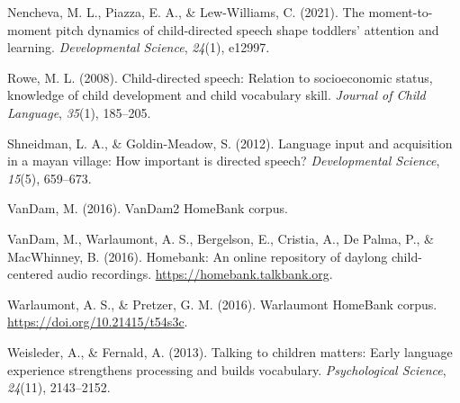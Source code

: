 \documentclass[10pt, letterpaper]{article}
\newenvironment{CSLReferences}%
  {}%
  {\par}
\begin{document}
\begin{CSLReferences}{1}{0}
\leavevmode\hypertarget{ref-nencheva2021moment}{}%
Nencheva, M. L., Piazza, E. A., \& Lew-Williams, C. (2021). The
moment-to-moment pitch dynamics of child-directed speech shape toddlers'
attention and learning. \emph{Developmental Science}, \emph{24}(1),
e12997.

\leavevmode\hypertarget{ref-rowe2008child}{}%
Rowe, M. L. (2008). Child-directed speech: Relation to socioeconomic
status, knowledge of child development and child vocabulary skill.
\emph{Journal of Child Language}, \emph{35}(1), 185--205.

\leavevmode\hypertarget{ref-shneidman2012language}{}%
Shneidman, L. A., \& Goldin-Meadow, S. (2012). Language input and
acquisition in a mayan village: How important is directed speech?
\emph{Developmental Science}, \emph{15}(5), 659--673.

\leavevmode\hypertarget{ref-vandamcorpus}{}%
VanDam, M. (2016). VanDam2 HomeBank corpus.

\leavevmode\hypertarget{ref-homebank}{}%
VanDam, M., Warlaumont, A. S., Bergelson, E., Cristia, A., De Palma, P.,
\& MacWhinney, B. (2016). Homebank: An online repository of daylong
child-centered audio recordings. \url{https://homebank.talkbank.org}.

\leavevmode\hypertarget{ref-warlaumontcorpus}{}%
Warlaumont, A. S., \& Pretzer, G. M. (2016). Warlaumont HomeBank corpus.
\url{https://doi.org/10.21415/t54s3c}.

\leavevmode\hypertarget{ref-weisleder2013talking}{}%
Weisleder, A., \& Fernald, A. (2013). Talking to children matters: Early
language experience strengthens processing and builds vocabulary.
\emph{Psychological Science}, \emph{24}(11), 2143--2152.

\end{CSLReferences}


\end{document}
